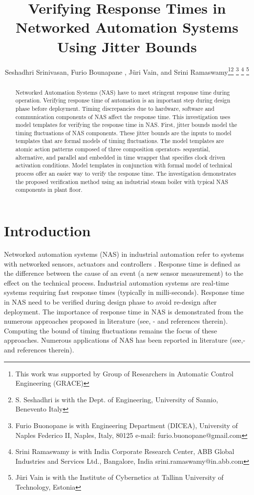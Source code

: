 \documentclass[letterpaper, 10 pt, conference]{ieeeconf}
\title{Verifying Response Times in Networked Automation Systems Using Jitter Bounds}
\author{Seshadhri Srinivasan, Furio Bounapane , J\"{u}ri Vain,  and Srini Ramaswamy\thanks{This work was supported by Group of Researchers in Automatic Control Engineering (GRACE)}\thanks{ S. Seshadhri is with the  Dept. of Engineering, University of Sannio, Benevento Italy}
\thanks{ Furio Buonopane is with Engineering Department (DICEA), University of Naples Federico II, Naples, Italy, 80125
e-mail: furio.buonopane@gmail.com}
\thanks{Srini Ramaswamy is with India Corporate Research Center, ABB Global Industries and Services Ltd., Bangalore, India 
srini.ramaswamy@in.abb.com}
\thanks{ J\"{u}ri Vain is with the Institute of Cybernetics at Tallinn University of Technology, Estonia}
}
\begin{document}
\maketitle
\thispagestyle{empty}
\pagestyle{empty}



\begin{abstract}
Networked Automation Systems (NAS) have to meet stringent response time during operation. Verifying response time of automation is an important step during design phase before deployment. Timing discrepancies due to hardware, software and communication components of NAS affect the response time. This investigation uses model templates for verifying the response time in NAS. First, jitter bounds model the timing fluctuations of NAS components. These jitter bounds are the inputs to model templates that are formal models of timing fluctuations. The model templates are atomic action patterns composed of three composition operators- sequential, alternative, and parallel and embedded in time wrapper that specifies clock driven activation conditions. Model templates in conjunction with formal model of technical process offer an easier way to verify the response time. The investigation demonstrates the proposed verification method using an industrial steam boiler with typical NAS components in plant floor. 





















\end{abstract}

\IEEEpeerreviewmaketitle
\section{Introduction}
Networked automation systems (NAS) in industrial automation refer to systems with networked sensors, actuators and controllers \cite{Vogel2012}. Response time is defined as the difference between the cause of an event (a new sensor measurement) to the effect on the technical process. Industrial automation systems are real-time systems requiring fast response times (typically in milli-seconds). Response time in NAS need to be verified during design phase to avoid re-design after deployment. The importance of response time in NAS is demonstrated from the numerous approaches proposed in literature (see, \cite{Pereira2004}-\cite{Addad2010} and references therein). Computing the bound of timing fluctuations remains the focus of these approaches. Numerous applications of NAS has been reported in literature (see,\cite{SeshCC}-\cite{Ganesh2014} and references therein).
\end{document}
